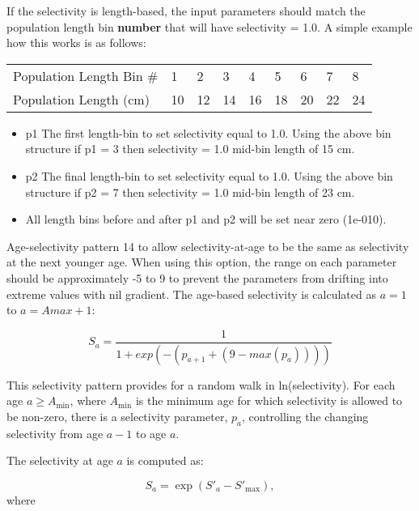 If the selectivity is length-based, the input parameters should match the population length bin \textbf{number} that will have selectivity = 1.0. A simple example how this works is as follows:

\begin{longtable}{p{4.5cm} p{0.9cm} p{0.9cm} p{0.9cm} p{0.9cm} p{0.9cm} p{0.9cm} p{0.9cm} p{0.9cm}}
	\hline	
	Population Length Bin \# \Tstrut & 1 & 2 & 3 & 4 & 5 & 6 & 7 & 8 \\
	Population Length (cm)      & 10 & 12 & 14 & 16 & 18 & 20 & 22 & 24 \Bstrut\\
	\hline
\end{longtable} 

\begin{itemize}
	\item p1 The first length-bin to set selectivity equal to 1.0. Using the above bin structure if p1 = 3 then selectivity = 1.0 mid-bin length of 15 cm.
	\item p2 The final length-bin to set selectivity equal to 1.0. Using the above bin structure if p2 = 7 then selectivity = 1.0 mid-bin length of 23 cm.
	\item All length bins before and after p1 and p2 will be set near zero (1e-010).
\end{itemize}

\hypertarget{ReviseAge}{}
Age-selectivity pattern 14 to allow selectivity-at-age to be the same as selectivity at the next younger age. When using this option, the range on each parameter should be approximately -5 to 9 to prevent the parameters from drifting into extreme values with nil gradient. The age-based selectivity is calculated as $a = 1$ to $a = Amax + 1$:

\begin{equation}
	S_a = \frac{1}{1+exp(-(p_{a+1} + (9 - max(p_a))))}
\end{equation}	

\hypertarget{RandomWalk}{}
This selectivity pattern provides for a random walk in ln(selectivity). For each age $a \geq A_{\text{min}}$, where $A_{\text{min}}$ is the minimum age for which selectivity is allowed to be non-zero, there is a selectivity parameter, $p_a$, controlling the changing selectivity from age $a-1$ to age $a$.
	
The selectivity at age $a$ is computed as:

	\begin{equation}
	S_a = \exp (S'_a - S'_{\text{max}}),
	\end{equation}
where

